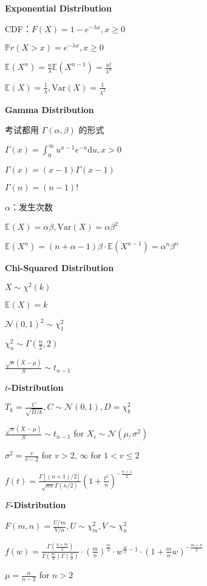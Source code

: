 \documentclass[9pt,landscape]{article}
\begin{document}
\begin{multicols}{3}
\textbf{Exponential Distribution}

CDF：$F(X)=1-e^{-\lambda x}, x\ge 0$

$\mathbb{P}r(X>x)=e^{-\lambda x}, x\ge 0$

$\mathbb{E}(X^n)=\frac{n}{\lambda}\mathbb{E}(X^{n-1})=\frac{n!}{\lambda^n}$

$\mathbb{E}(X)=\frac{1}{\lambda}, \mathrm{Var}(X)=\frac{1}{\lambda^2}$

\textbf{Gamma Distribution}

考试都用 $\Gamma(\alpha, \beta)$ 的形式

$\Gamma(x)=\int_{0}^{\infty}u^{x-1}e^{-u}\mathrm{d}u, x>0$

$\Gamma(x)=(x-1)\Gamma(x - 1)$

$\Gamma(n)=(n-1)!$

$\alpha$：发生次数

$\mathbb{E}(X)=\alpha\beta, \mathrm{Var}(X)=\alpha\beta^2$

$\mathbb{E}(X^n)=(n+\alpha-1)\beta\cdot\mathbb{E}(X^{n-1})=\alpha^{\overline{n}}\beta^n$

\textbf{Chi-Squared Distribution}

$X\sim \chi^2(k)$

$\mathbb{E}(X)=k$

$\mathcal{N}(0, 1)^2\sim \chi^2_1$

$\chi^2_n\sim \Gamma\left(\frac{n}{2}, 2\right)$

$\frac{\sqrt{n}(\overline{X}-\mu)}{S}\sim t_{n-1}$

\textbf{$t$-Distribution}

$T_k = \frac{C}{\sqrt{D/k}}, C\sim\mathcal{N}(0, 1), D = \chi^2_k$

$\frac{\sqrt{n}(\overline{X}-\mu)}{S}\sim t_{n-1}$ for $X_i\sim \mathcal{N}(\mu, \sigma^2)$

$\sigma^2=\frac{v}{v-2}$ for $v>2$, $\infty$ for $1<v\le 2$

$f(t)=\frac{\Gamma[(n + 1) / 2]}{\sqrt{n\pi}\Gamma(n/2)}\left(1 + \frac{t^2}{n}\right)^{-\frac{n + 1}{2}}$

\textbf{$F$-Distribution}

$F(m, n) = \frac{U/m}{V/n}, U\sim\chi_m^2, V\sim \chi_n^2$

$f(w)=\frac{\Gamma\left(\frac{n+m}{2}\right)}{\Gamma\left(\frac{m}{2}\right)\Gamma\left(\frac{n}{2}\right)}\cdot\left(\frac{m}{n}\right)^{\frac{m}{2}}\cdot w^{\frac{m}{2}-1}\cdot\left(1+\frac{m}{n}w\right)^{-\frac{m+n}{2}}$

$\mu=\frac{n}{n-2}$ for $n>2$


\end{multicols}
\end{document}
